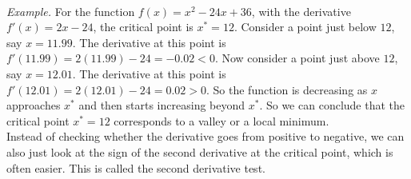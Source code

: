 \documentclass{./../../latex/handout}
\begin{document}
\begin{center}
 \\
\end{center} 

\textit{Example.} For the function $f(x) = x^2 -24 x + 36 $, with the derivative $f'(x)=2x-24$, the critical point is $x^*=12$. Consider a point just below $12$, say $x=11.99$. The derivative at this point is $f'(11.99)=2(11.99)-24=-0.02<0$. Now consider a point just above $12$, say $x=12.01$. The derivative at this point is $f'(12.01)=2(12.01)-24=0.02>0$. So the function is decreasing as $x$ approaches $x^*$ and then starts increasing beyond $x^*$. So we can conclude that the critical point $x^*=12$ corresponds to a valley or a local minimum. \\

Instead of checking whether the derivative goes from positive to negative, we can also just look at the sign of the second derivative at the critical point, which is often easier. This is called the second derivative test. \\

 \\
\end{document}
